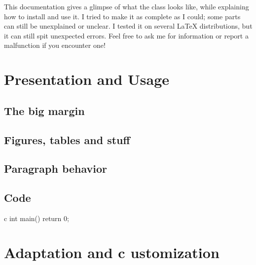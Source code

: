 \documentclass[raggedright, 11pt]{tufte-style-article}
\begin{document}
This documentation gives a glimpse of what the class looks like, while explaining how to install and use it. I tried to make it as complete as I could; some parts can still be unexplained or unclear. I tested it on several \LaTeX{} distributions, but it can still spit unexpected errors. Feel free to ask me for information or report a malfunction if you encounter one!

\section{Presentation and Usage}

\subsection{The big margin}

\subsection{Figures, tables and stuff}

\subsection{Paragraph behavior}

\subsection{Code}

\begin{codebox}{c}
int main() {
	return 0;	
}
\end{codebox}

\section{Adaptation and c	ustomization}
\end{document}
